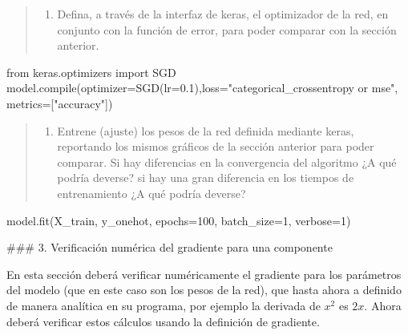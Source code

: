 \documentclass[11pt]{article}
\providecommand{\tightlist}{%
      \setlength{\itemsep}{0pt}\setlength{\parskip}{0pt}}
\newenvironment{Shaded}{}{}
\newcommand{\DecValTok}[1]{\textcolor[rgb]{0.25,0.63,0.44}{{#1}}}
\newcommand{\FloatTok}[1]{\textcolor[rgb]{0.25,0.63,0.44}{{#1}}}
\newcommand{\StringTok}[1]{\textcolor[rgb]{0.25,0.44,0.63}{{#1}}}
\newcommand{\NormalTok}[1]{{#1}}
\newcommand{\ImportTok}[1]{{#1}}
\newcommand{\OperatorTok}[1]{\textcolor[rgb]{0.40,0.40,0.40}{{#1}}}
\newcommand{\BuiltInTok}[1]{{#1}}
\begin{document}
\begin{quote}
\begin{enumerate}
\def\labelenumi{\alph{enumi})}
\setcounter{enumi}{1}
\tightlist
\item
  Defina, a través de la interfaz de keras, el optimizador de la red, en
  conjunto con la función de error, para poder comparar con la sección
  anterior.
\end{enumerate}
\end{quote}

\begin{Shaded}
\begin{Highlighting}[]
\ImportTok{from}\NormalTok{ keras.optimizers }\ImportTok{import}\NormalTok{ SGD}
\NormalTok{model.}\BuiltInTok{compile}\NormalTok{(optimizer}\OperatorTok{=}\NormalTok{SGD(lr}\OperatorTok{=}\FloatTok{0.1}\NormalTok{),loss}\OperatorTok{=}\StringTok{"categorical_crossentropy or mse"}\NormalTok{, metrics}\OperatorTok{=}\NormalTok{[}\StringTok{"accuracy"}\NormalTok{])}
\end{Highlighting}
\end{Shaded}

\begin{quote}
\begin{enumerate}
\def\labelenumi{\alph{enumi})}
\setcounter{enumi}{2}
\tightlist
\item
  Entrene (ajuste) los pesos de la red definida mediante keras,
  reportando los mismos gráficos de la sección anterior para poder
  comparar. Si hay diferencias en la convergencia del algoritmo ¿A qué
  podría deverse? si hay una gran diferencia en los tiempos de
  entrenamiento ¿A qué podría deverse?
\end{enumerate}
\end{quote}

\begin{Shaded}
\begin{Highlighting}[]
\NormalTok{model.fit(X_train, y_onehot, epochs}\OperatorTok{=}\DecValTok{100}\NormalTok{, batch_size}\OperatorTok{=}\DecValTok{1}\NormalTok{, verbose}\OperatorTok{=}\DecValTok{1}\NormalTok{)}
\end{Highlighting}
\end{Shaded}

     \#\#\# 3. Verificación numérica del gradiente para una componente

En esta sección deberá verificar numéricamente el gradiente para los
parámetros del modelo (que en este caso son los pesos de la red), que
hasta ahora a definido de manera analítica en su programa, por ejemplo
la derivada de \(x^2\) es \(2x\). Ahora deberá verificar estos cálculos
usando la definición de gradiente.
\end{document}
